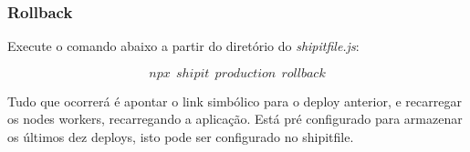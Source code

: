 \subsubsection{Rollback}
Execute o comando abaixo a partir do diretório do
\emph{shipitfile.js}:

$$npx\ \ shipit\ \ production\ \ rollback$$

Tudo que ocorrerá é apontar o link simbólico para o deploy anterior, e
recarregar os nodes workers, recarregando a aplicação. Está pré
configurado para armazenar os últimos dez deploys, isto pode ser
configurado no shipitfile.


